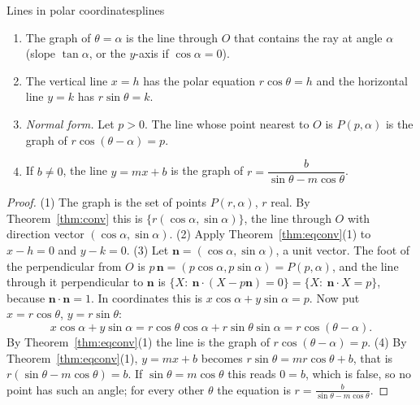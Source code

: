 \documentclass[11pt]{article}
\begin{document}
\begin{thm}{Lines in polar coordinates}{plines}
\begin{enumerate}[nosep]
  \item The graph of $\theta=\alpha$ is the line through $O$ that contains the ray at angle $\alpha$ (slope $\tan\alpha$, or the $y$-axis if $\cos\alpha=0$).
  \item The vertical line $x=h$ has the polar equation $r\cos\theta=h$ and the horizontal line $y=k$ has $r\sin\theta=k$.
  \item \emph{Normal form.} Let $p>0$. The line whose point nearest to $O$ is $P(p,\alpha)$ is the graph of $r\cos(\theta-\alpha)=p$.
  \item If $b\ne0$, the line $y=mx+b$ is the graph of $r=\dfrac{b}{\sin\theta-m\cos\theta}$.
\end{enumerate}
\end{thm}
\begin{proof}
(1) The graph is the set of points $P(r,\alpha)$, $r$ real. By Theorem~\ref{thm:conv} this is $\{r(\cos\alpha,\sin\alpha)\}$, the line through $O$ with direction vector $(\cos\alpha,\sin\alpha)$.
(2) Apply Theorem~\ref{thm:eqconv}(1) to $x-h=0$ and $y-k=0$.
(3) Let $\mathbf n=(\cos\alpha,\sin\alpha)$, a unit vector. The foot of the perpendicular from $O$ is $p\,\mathbf n=(p\cos\alpha,p\sin\alpha)=P(p,\alpha)$, and the line through it perpendicular to $\mathbf n$ is $\{X:\ \mathbf n\cdot(X-p\mathbf n)=0\}=\{X:\ \mathbf n\cdot X=p\}$, because $\mathbf n\cdot\mathbf n=1$. In coordinates this is $x\cos\alpha+y\sin\alpha=p$. Now put $x=r\cos\theta$, $y=r\sin\theta$:
\[
x\cos\alpha+y\sin\alpha=r\cos\theta\cos\alpha+r\sin\theta\sin\alpha=r\cos(\theta-\alpha).
\]
By Theorem~\ref{thm:eqconv}(1) the line is the graph of $r\cos(\theta-\alpha)=p$.
(4) By Theorem~\ref{thm:eqconv}(1), $y=mx+b$ becomes $r\sin\theta=mr\cos\theta+b$, that is $r(\sin\theta-m\cos\theta)=b$. If $\sin\theta=m\cos\theta$ this reads $0=b$, which is false, so no point has such an angle; for every other $\theta$ the equation is $r=\frac b{\sin\theta-m\cos\theta}$.
\end{proof}
\end{document}
